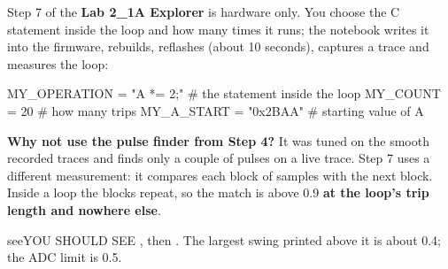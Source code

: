 \documentclass[11pt,letterpaper]{article}
\begin{document}
\vspace{4pt}


Step 7 of the \textbf{Lab 2\_1A Explorer} is hardware only. You choose the C statement inside the loop and how many
times it runs; the notebook writes it into the firmware, rebuilds, reflashes (about 10 seconds), captures a trace and
measures the loop:

\begin{guidecode}
MY_OPERATION = "A *= 2;"      # the statement inside the loop
MY_COUNT     = 20             # how many trips
MY_A_START   = "0x2BAA"       # starting value of A
\end{guidecode}

\textbf{Why not use the pulse finder from Step 4?} It was tuned on the smooth recorded traces and finds only a couple
of pulses on a live trace. Step 7 uses a different measurement: it compares each block of  samples with the
next block. Inside a loop the blocks repeat, so the match is above 0.9 \textbf{at the loop's trip length and nowhere
else}.


\begin{guidecallout}{see}{YOU SHOULD SEE}
, then . The largest swing printed above it is about 0.4; the ADC limit is 0.5.
\end{guidecallout}

\end{document}
